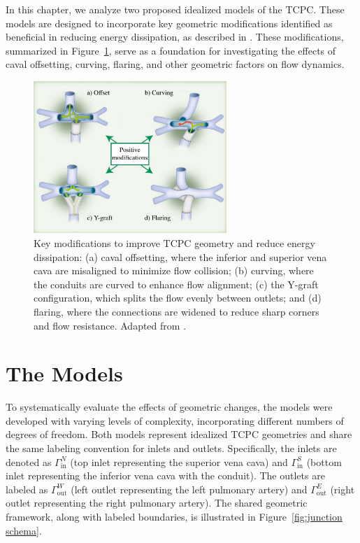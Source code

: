 In this chapter, we analyze two proposed idealized models of the TCPC. These models are designed to incorporate key geometric modifications identified as beneficial in reducing energy dissipation, as described in \cite{Rijnberg2018}. These modifications, summarized in Figure~\ref{fig:positive_modifications}, serve as a foundation for investigating the effects of caval offsetting, curving, flaring, and other geometric factors on flow dynamics.

\begin{figure}[H]
	\centering
	\includegraphics[width=0.65\textwidth]{figures/energyloss-en.pdf}
	\caption[Positive Modifications for TCPC]{Key modifications to improve TCPC geometry and reduce energy dissipation: (a) caval offsetting, where the inferior and superior vena cava are misaligned to minimize flow collision; (b) curving, where the conduits are curved to enhance flow alignment; (c) the Y-graft configuration, which splits the flow evenly between outlets; and (d) flaring, where the connections are widened to reduce sharp corners and flow resistance. Adapted from \cite{Rijnberg2018}.}
	\label{fig:positive_modifications}
\end{figure}

\section{The Models}

To systematically evaluate the effects of geometric changes, the models were developed with varying levels of complexity, incorporating different numbers of degrees of freedom. Both models represent idealized TCPC geometries and share the same labeling convention for inlets and outlets. Specifically, the inlets are denoted as $\Gamma^{N}_{\text{in}}$ (top inlet representing the superior vena cava) and $\Gamma^{S}_{\text{in}}$ (bottom inlet representing the inferior vena cava with the conduit). The outlets are labeled as $\Gamma^{W}_{\text{out}}$ (left outlet representing the left pulmonary artery) and $\Gamma^{E}_{\text{out}}$ (right outlet representing the right pulmonary artery). The shared geometric framework, along with labeled boundaries, is illustrated in Figure~\ref{fig:junction schema}.

